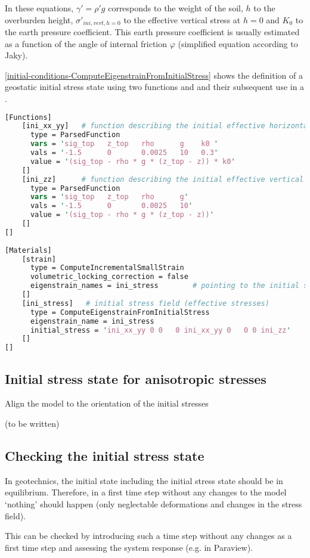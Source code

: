 In these equations, $\gamma'=\rho' g$ corresponds to the weight of the soil,
$h$ to the overburden height, $\sigma'_{ini,vert,h=0}$ to the effective
vertical stress at $h=0$ and $K_0$ to the earth pressure coefficient. This
earth pressure coefficient is usually estimated as a function of the angle of
internal friction $\varphi$ (simplified equation according to Jaky).

\autoref{initial-conditions-ComputeEigenstrainFromInitialStress} shows the
definition of a geostatic initial stress state using two functions
 and  and their subsequent use in a
.

\begin{lstlisting}[language=perl, float, caption={Definition of a geostatic initial stress state using ‘ComputeEigenstrainFromInitialStress’ },label={initial-conditions-ComputeEigenstrainFromInitialStress}]
[Functions]
    [ini_xx_yy]   # function describing the initial effective horizontal stress field
      type = ParsedFunction
      vars = 'sig_top   z_top   rho      g    k0 '
      vals = '-1.5      0       0.0025   10   0.3'
      value = '(sig_top - rho * g * (z_top - z)) * k0'
    []
    [ini_zz]      # function describing the initial effective vertical stress field
      type = ParsedFunction
      vars = 'sig_top   z_top   rho      g'
      vals = '-1.5      0       0.0025   10'
      value = '(sig_top - rho * g * (z_top - z))'
    []
[]
  
[Materials]
    [strain]
      type = ComputeIncrementalSmallStrain
      volumetric_locking_correction = false
      eigenstrain_names = ini_stress        # pointing to the initial stress field
    []
    [ini_stress]   # initial stress field (effective stresses)
      type = ComputeEigenstrainFromInitialStress
      eigenstrain_name = ini_stress
      initial_stress = 'ini_xx_yy 0 0   0 ini_xx_yy 0   0 0 ini_zz'
    []
[]
\end{lstlisting}

\subsection{Initial stress state for anisotropic stresses}
\label{chap:IC-stress-state-anisotropic}

Align the model to the orientation of the initial stresses

(to be written)

\subsection{Checking the initial stress state}
\label{chap:IC-check}

In geotechnics, the initial state including the initial stress state should be
in equilibrium. Therefore, in a first time step without any changes to the
model ‘nothing’ should happen (only neglectable deformations and changes in the
stress field).

This can be checked by introducing such a time step without any changes as a
first time step and assessing the system response (e.g. in Paraview).
